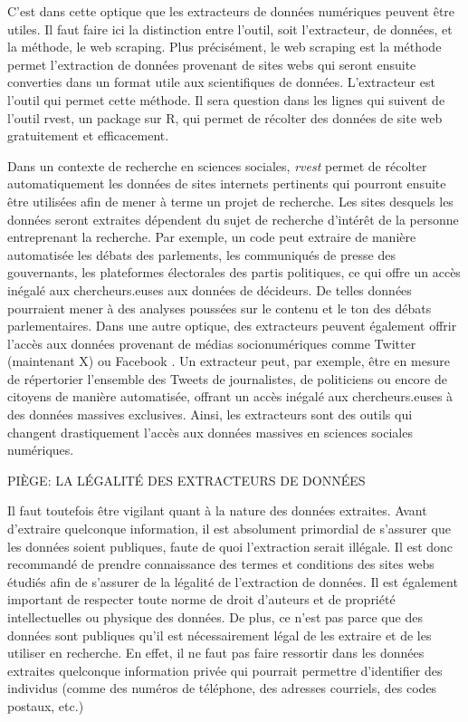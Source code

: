 \documentclass[
  letterpaper,
  DIV=11,
  numbers=noendperiod]{scrreprt}
\begin{document}
C'est dans cette optique que les extracteurs de données numériques
peuvent être utiles. Il faut faire ici la distinction entre l'outil,
soit l'extracteur, de données, et la méthode, le web scraping. Plus
précisément, le web scraping est la méthode permet l'extraction de
données provenant de sites webs qui seront ensuite converties dans un
format utile aux scientifiques de données. L'extracteur est l'outil qui
permet cette méthode. Il sera question dans les lignes qui suivent de
l'outil rvest, un package sur R, qui permet de récolter des données de
site web gratuitement et efficacement.

Dans un contexte de recherche en sciences sociales, \emph{rvest} permet
de récolter automatiquement les données de sites internets pertinents
qui pourront ensuite être utilisées afin de mener à terme un projet de
recherche. Les sites desquels les données seront extraites dépendent du
sujet de recherche d'intérêt de la personne entreprenant la recherche.
Par exemple, un code peut extraire de manière automatisée les débats des
parlements, les communiqués de presse des gouvernants, les plateformes
électorales des partis politiques, ce qui offre un accès inégalé aux
chercheurs.euses aux données de décideurs. De telles données pourraient
mener à des analyses poussées sur le contenu et le ton des débats
parlementaires. Dans une autre optique, des extracteurs peuvent
également offrir l'accès aux données provenant de médias socionumériques
comme Twitter (maintenant X) ou Facebook . Un extracteur peut, par
exemple, être en mesure de répertorier l'ensemble des Tweets de
journalistes, de politiciens ou encore de citoyens de manière
automatisée, offrant un accès inégalé aux chercheurs.euses à des données
massives exclusives. Ainsi, les extracteurs sont des outils qui changent
drastiquement l'accès aux données massives en sciences sociales
numériques.

PIÈGE: LA LÉGALITÉ DES EXTRACTEURS DE DONNÉES

Il faut toutefois être vigilant quant à la nature des données extraites.
Avant d'extraire quelconque information, il est absolument primordial de
s'assurer que les données soient publiques, faute de quoi l'extraction
serait illégale. Il est donc recommandé de prendre connaissance des
termes et conditions des sites webs étudiés afin de s'assurer de la
légalité de l'extraction de données. Il est également important de
respecter toute norme de droit d'auteurs et de propriété intellectuelles
ou physique des données. De plus, ce n'est pas parce que des données
sont publiques qu'il est nécessairement légal de les extraire et de les
utiliser en recherche. En effet, il ne faut pas faire ressortir dans les
données extraites quelconque information privée qui pourrait permettre
d'identifier des individus (comme des numéros de téléphone, des adresses
courriels, des codes postaux, etc.)
\end{document}
